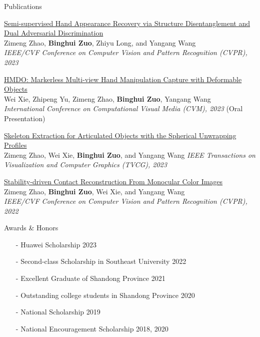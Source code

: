 \documentclass{template_2311} %
\def\myname{\textbf{Binghui Zuo}}
\begin{document}
\begin{rSection}{Publications}
\begin{enumerate}[label={[}\arabic*{]}, ref={\arabic*}]
\item \href{https://openaccess.thecvf.com/content/CVPR2023/papers/Zhao_Semi-Supervised_Hand_Appearance_Recovery_via_Structure_Disentanglement_and_Dual_Adversarial_CVPR_2023_paper.pdf} {Semi-supervised Hand Appearance Recovery via Structure Disentanglement and Dual Adversarial Discrimination} \\
Zimeng Zhao, \myname, Zhiyu Long, and Yangang Wang\\
\emph{IEEE/CVF Conference on Computer Vision and Pattern Recognition (CVPR), 2023}

\item \href{https://www.sciencedirect.com/science/article/pii/S1524070323000085} {HMDO: Markerless Multi-view Hand Manipulation Capture with Deformable Objects} \\
Wei Xie, Zhipeng Yu, Zimeng Zhao, \myname, Yangang Wang\\
\emph{International Conference on Computational Visual Media (CVM), 2023} \textcolor[rgb]{1,0,0}{(Oral Presentation)}

\item \href{https://ieeexplore.ieee.org/document/10025400} {Skeleton Extraction for Articulated Objects with the Spherical Unwrapping Profiles}\\
Zimeng Zhao, Wei Xie, \myname, and Yangang Wang
\emph{IEEE Transactions on Visualization and Computer Graphics (TVCG), 2023}

\item \href{https://openaccess.thecvf.com/content/CVPR2022/papers/Zhao_Stability-Driven_Contact_Reconstruction_From_Monocular_Color_Images_CVPR_2022_paper.pdf} {Stability-driven Contact Reconstruction From Monocular Color Images}\\
Zimeng Zhao, \myname, Wei Xie, and Yangang Wang\\
\emph{IEEE/CVF Conference on Computer Vision and Pattern Recognition (CVPR), 2022} 
\end{enumerate}
\end{rSection}
\begin{rSection}{Awards \& Honors}
\begin{itemize}
    \item[-] Huawei Scholarship \hfill 2023
    \item[-] Second-class Scholarship in Southeast University \hfill 2022
    \item[-] Excellent Graduate of Shandong Province \hfill 2021
    \item[-] Outstanding college students in Shandong Province \hfill 2020
    \item[-] National Scholarship \hfill 2019
    \item[-] National Encouragement Scholarship \hfill 2018, 2020
\end{itemize}
\end{rSection}
\end{document}
